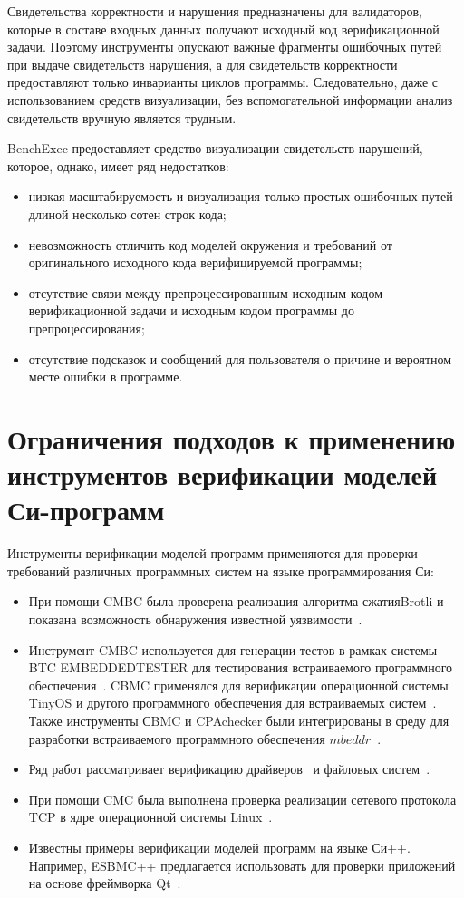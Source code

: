 Свидетельства корректности и нарушения предназначены для валидаторов, которые в составе входных данных получают исходный код верификационной задачи.
Поэтому инструменты опускают важные фрагменты ошибочных путей при выдаче свидетельств нарушения, а для свидетельств корректности предоставляют только инварианты циклов программы.
Следовательно, даже с использованием средств визуализации, без вспомогательной информации анализ свидетельств вручную является трудным.

BenchExec предоставляет средство визуализации свидетельств нарушений, которое, однако, имеет ряд недостатков:
\begin{itemize}
    \item низкая масштабируемость и визуализация только простых ошибочных путей длиной несколько сотен строк кода;
    \item невозможность отличить код моделей окружения и требований от оригинального исходного кода верифицируемой программы;
    \item отсутствие связи между препроцессированным исходным кодом верификационной задачи и исходным кодом программы до препроцессирования;
    \item отсутствие подсказок и сообщений для пользователя о причине и вероятном месте ошибки в программе.
\end{itemize}

\section{Ограничения подходов к применению инструментов верификации моделей Си-программ}
Инструменты верификации моделей программ применяются для проверки требований различных программных систем на языке программирования Си:
\begin{itemize}
    \item При помощи CMBC была проверена реализация алгоритма сжатия\break Brotli\cite{brotli} и показана возможность обнаружения известной уязвимости~\cite{neville2016a}.
    \item Инструмент CMBC используется для генерации тестов в рамках системы BTC EMBEDDEDTESTER для тестирования встраиваемого программного обеспечения~\cite{CMBCreuse}. CBMC применялся для верификации операционной системы TinyOS и другого программного обеспечения для встраиваемых систем~\cite{Schlich2009, Bucur:2010:SVT}. Также инструменты СBMC и CPAchecker были интегрированы в среду для разработки встраиваемого программного обеспечения $mbeddr$~\cite{mbeddr}. 
    \item Ряд работ рассматривает верификацию драйверов~\cite{Post:2009:TAS,Witkowski:2007:MCC, ModelingLargeSystems, FlashDriver, ConcurBugsRakamaric} и файловых систем~\cite{Galloway:2008:MLV, Yang:2006:UMC}.
    \item При помощи CMC была выполнена проверка реализации сетевого протокола TCP в ядре операционной системы Linux~\cite{Musuvathi:2004:MCL}.
    \item Известны примеры верификации моделей программ на языке Си++. Например, ESBMC++ предлагается использовать для проверки приложений на основе фреймворка Qt~\cite{QTverification}.
\end{itemize}

